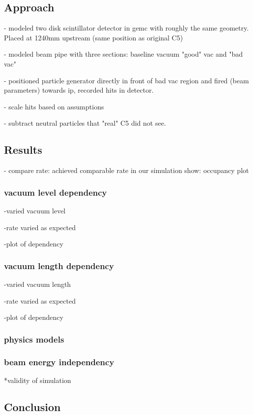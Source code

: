 \subsection{Approach}
- modeled two disk scintillator detector in gemc with roughly the same geometry.  Placed at 1240mm upstream (same position as original C5)

- modeled beam pipe with three sections: baseline vacuum "good" vac and "bad vac" 

- positioned particle generator directly in front of bad vac region and fired (beam parameters) towards ip, recorded hits in detector.

- scale hits based on assumptions

- subtract neutral particles that "real" C5 did not see.

\subsection{Results}
- compare rate: achieved comparable rate in our simulation
show: occupancy plot

\subsubsection{vacuum level dependency}
-varied vacuum level

-rate varied as expected

-plot of dependency

\subsubsection{vacuum length dependency}
-varied vacuum length

-rate varied as expected

-plot of dependency

\subsubsection{physics models}

\subsubsection{beam energy independency}


*validity of simulation
\subsection{Conclusion}